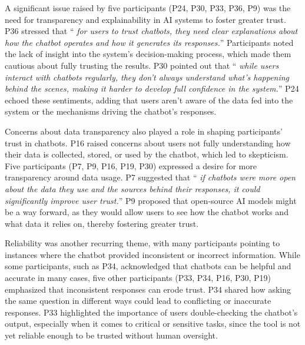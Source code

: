 \documentclass[sigconf]{acmart}
\begin{document}
A significant issue raised by five participants (P24, P30, P33, P36, P9) was the need for transparency and explainability in AI systems to foster greater trust. P36 stressed that \enquote { \emph {for users to trust chatbots, they need clear explanations about how the chatbot operates and how it generates its responses.}} Participants noted the lack of insight into the system's decision-making process, which made them cautious about fully trusting the results. P30 pointed out that \enquote { \emph {while users interact with chatbots regularly, they don’t always understand what’s happening behind the scenes, making it harder to develop full confidence in the system.}} P24 echoed these sentiments, adding that users aren’t aware of the data fed into the system or the mechanisms driving the chatbot’s responses.

Concerns about data transparency also played a role in shaping participants’ trust in chatbots. P16 raised concerns about users not fully understanding how their data is collected, stored, or used by the chatbot, which led to skepticism. Five participants (P7, P9, P16, P19, P30) expressed a desire for more transparency around data usage. P7 suggested that \enquote { \emph {if chatbots were more open about the data they use and the sources behind their responses, it could significantly improve user trust.}} P9 proposed that open-source AI models might be a way forward, as they would allow users to see how the chatbot works and what data it relies on, thereby fostering greater trust.

Reliability was another recurring theme, with many participants pointing to instances where the chatbot provided inconsistent or incorrect information. While some participants, such as P34, acknowledged that chatbots can be helpful and accurate in many cases, five other participants (P33, P34, P16, P30, P19) emphasized that inconsistent responses can erode trust. P34 shared how asking the same question in different ways could lead to conflicting or inaccurate responses. P33 highlighted the importance of users double-checking the chatbot's output, especially when it comes to critical or sensitive tasks, since the tool is not yet reliable enough to be trusted without human oversight.
\end{document}
